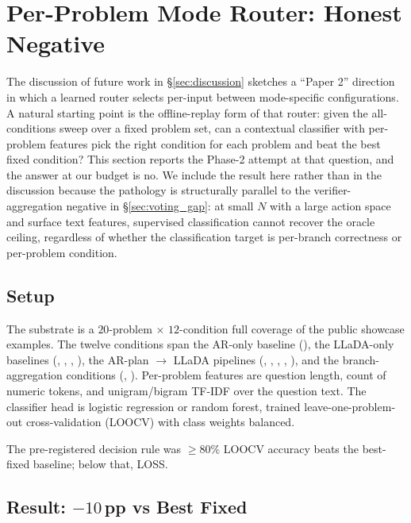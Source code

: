 \section{Per-Problem Mode Router: Honest Negative}
\label{sec:mode_router}

The discussion of future work in \S\ref{sec:discussion} sketches a
``Paper 2'' direction in which a learned router selects per-input
between mode-specific configurations.  A natural starting point is
the offline-replay form of that router: given the all-conditions
sweep over a fixed problem set, can a contextual classifier with
per-problem features pick the right condition for each problem and
beat the best fixed condition?  This section reports the Phase-2
attempt at that question, and the answer at our budget is no.  We
include the result here rather than in the discussion because the
pathology is structurally parallel to the verifier-aggregation
negative in \S\ref{sec:voting_gap}: at small $N$ with a large action
space and surface text features, supervised classification cannot
recover the oracle ceiling, regardless of whether the classification
target is per-branch correctness or per-problem condition.

\subsection{Setup}
\label{subsec:mode_router_setup}

The substrate is a $20$-problem $\times$ $12$-condition full
coverage of the public showcase examples.  The twelve conditions
span the AR-only baseline (), the LLaDA-only baselines
(, , , ), the AR-plan
$\to$ LLaDA pipelines (, , ,
, ), and the branch-aggregation conditions
(, ).  Per-problem features are
question length, count of numeric tokens, and unigram/bigram TF-IDF
over the question text.  The classifier head is logistic regression
or random forest, trained leave-one-problem-out cross-validation
(LOOCV) with class weights balanced.

The pre-registered decision rule was $\geq 80\%$ LOOCV accuracy
beats the best-fixed baseline; below that, LOSS.

\subsection{Result: $-10$\,pp vs Best Fixed}
\label{subsec:mode_router_result}

